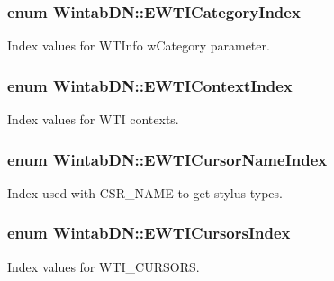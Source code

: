 \hypertarget{namespace_wintab_d_n_aeb27579e91c95fb5a7bf4a4a9dc7f875}{
\subsubsection[{EWTICategoryIndex}]{\setlength{\rightskip}{0pt plus 5cm}enum {\bf WintabDN::EWTICategoryIndex}}}
\label{namespace_wintab_d_n_aeb27579e91c95fb5a7bf4a4a9dc7f875}


Index values for WTInfo wCategory parameter. 

\hypertarget{namespace_wintab_d_n_a75b4777047ea6ca407c8cd928ca9ef26}{
\subsubsection[{EWTIContextIndex}]{\setlength{\rightskip}{0pt plus 5cm}enum {\bf WintabDN::EWTIContextIndex}}}
\label{namespace_wintab_d_n_a75b4777047ea6ca407c8cd928ca9ef26}


Index values for WTI contexts. 

\hypertarget{namespace_wintab_d_n_a54fdc0e52106effb073b35f8f6b3920a}{
\subsubsection[{EWTICursorNameIndex}]{\setlength{\rightskip}{0pt plus 5cm}enum {\bf WintabDN::EWTICursorNameIndex}}}
\label{namespace_wintab_d_n_a54fdc0e52106effb073b35f8f6b3920a}


Index used with CSR\_\-NAME to get stylus types. 

\hypertarget{namespace_wintab_d_n_a215ef64798be3e0207e5bbf438659d61}{
\subsubsection[{EWTICursorsIndex}]{\setlength{\rightskip}{0pt plus 5cm}enum {\bf WintabDN::EWTICursorsIndex}}}
\label{namespace_wintab_d_n_a215ef64798be3e0207e5bbf438659d61}


Index values for WTI\_\-CURSORS. 

